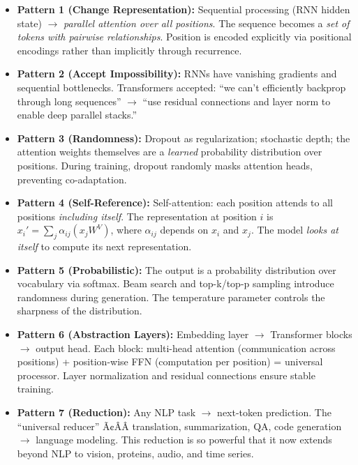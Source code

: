 \begin{itemize}
\item \textbf{Pattern 1 (Change Representation):} Sequential processing (RNN hidden state) $\to$ \emph{parallel attention over all positions}. The sequence becomes a \emph{set of tokens with pairwise relationships}. Position is encoded explicitly via positional encodings rather than implicitly through recurrence.

\item \textbf{Pattern 2 (Accept Impossibility):} RNNs have vanishing gradients and sequential bottlenecks. Transformers accepted: ``we can't efficiently backprop through long sequences'' $\to$ ``use residual connections and layer norm to enable deep parallel stacks.''

\item \textbf{Pattern 3 (Randomness):} Dropout as regularization; stochastic depth; the attention weights themselves are a \emph{learned} probability distribution over positions. During training, dropout randomly masks attention heads, preventing co-adaptation.

\item \textbf{Pattern 4 (Self-Reference):} Self-attention: each position attends to all positions \emph{including itself}. The representation at position $i$ is $x_i' = \sum_j \alpha_{ij}(x_j W^V)$, where $\alpha_{ij}$ depends on $x_i$ and $x_j$. The model \emph{looks at itself} to compute its next representation.

\item \textbf{Pattern 5 (Probabilistic):} The output is a probability distribution over vocabulary via softmax. Beam search and top-k/top-p sampling introduce randomness during generation. The temperature parameter controls the sharpness of the distribution.

\item \textbf{Pattern 6 (Abstraction Layers):} Embedding layer $\to$ Transformer blocks $\to$ output head. Each block: multi-head attention (communication across positions) + position-wise FFN (computation per position) = universal processor. Layer normalization and residual connections ensure stable training.

\item \textbf{Pattern 7 (Reduction):} Any NLP task $\to$ next-token prediction. The ``universal reducer'' Ã¢ÂÂ translation, summarization, QA, code generation $\to$ language modeling. This reduction is so powerful that it now extends beyond NLP to vision, proteins, audio, and time series.


\end{itemize}
